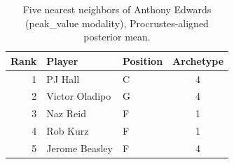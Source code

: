 \begin{table}[htbp]
  \centering\small
  \begin{tabular}{rllc}
    \toprule
    Rank & Player & Position & Archetype \\
    \midrule
    1 & PJ Hall & C & 4 \\
    2 & Victor Oladipo & G & 4 \\
    3 & Naz Reid & F & 1 \\
    4 & Rob Kurz & F & 1 \\
    5 & Jerome Beasley & F & 4 \\
    \bottomrule
  \end{tabular}
  \caption{Five nearest neighbors of Anthony Edwards (peak_value modality), Procrustes-aligned posterior mean.}
  \label{tab:Anthony_Edwards_neighbors_peak_value}
\end{table}

